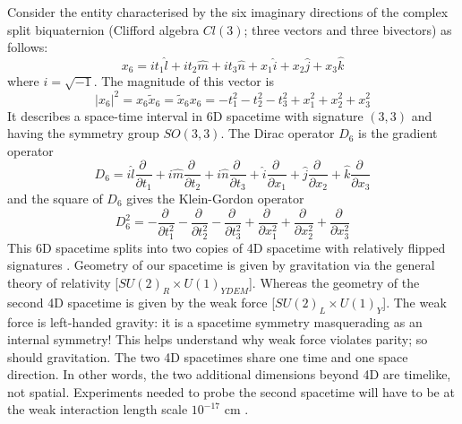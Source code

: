 \documentclass{iopconfser}
\begin{document}
Consider the entity characterised by the six imaginary directions of the complex split biquaternion (Clifford algebra $Cl(3)$; three vectors and three bivectors) as follows:
\begin{equation}
x_6 = it_1 \hat l + i t_2 \hat m + i t_3 \hat n + x_1 \hat i + x_2 \hat j + x_3 \hat k
\label{3ve6}
\end{equation}
where $i=\sqrt{-1}$. The magnitude of this vector is
\begin{equation}
|x_6|^2 = x_6 {\tilde x}_6 = {\tilde x}_6 x_6 = -t_1^2 - t_2^2 - t_3^2 + x_1^2 + x_2^2 + x_3^2
\label{3ve6sq}
\end{equation}
It describes a space-time interval in 6D spacetime with signature $(3,3)$ and having the symmetry group $SO(3,3)$. The Dirac operator $D_6$ is the gradient operator
\begin{equation}
D_6 = i\hat l\frac{ \partial\ }{\partial t_1} + i\hat m \frac{ \partial\ }{\partial t_2} + i\hat n\frac{ \partial\ }{\partial t_3} + \hat i \frac{ \partial\ }{\partial x_1} + \hat j\frac{ \partial\ }{\partial x_2} + \hat k\frac{ \partial\ }{\partial x_3} 
\label{3D6op}
\end{equation}
and the square of $D_6$ gives the Klein-Gordon operator
\begin{equation}
D_6^2 = -\frac{\partial\ }{\partial t_1^2}  -\frac{\partial\ }{\partial t_2^2}  -\frac{\partial\ }{\partial t_3^2}  +\frac{\partial\ }{\partial x_1^2}  +\frac{\partial\ }{\partial x_2^2}  +\frac{\partial\ }{\partial x_3^2} 
\label{3D6sq}
\end{equation}
This 6D spacetime splits into two copies of 4D spacetime with relatively flipped signatures \cite{Kritov}. Geometry of our spacetime is given by gravitation via the general theory of relativity [$SU(2)_R \times U(1)_{YDEM}$]. Whereas the geometry of the second 4D spacetime is given by the weak force [$SU(2)_L \times U(1)_Y$]. The weak force is left-handed gravity: it is a spacetime symmetry masquerading as an internal symmetry! This helps understand why weak force violates parity; so should gravitation. The two 4D spacetimes share one time and one space direction. In other words, the two additional dimensions beyond 4D are timelike, not spatial. Experiments needed to probe the second spacetime will have to be at the weak interaction length scale $10^{-17}$ cm \cite{Kau}.
\end{document}

